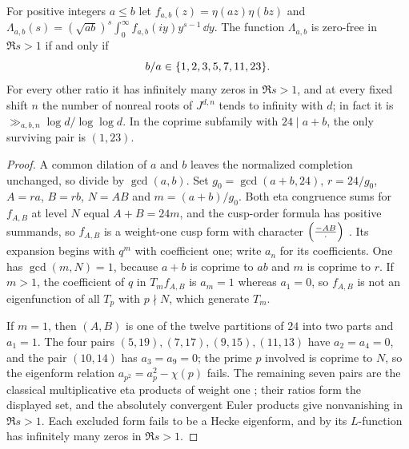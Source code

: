 \begin{theorem}\label{hec:thm:etafamily}
For positive integers $a\le b$ let $f_{a,b}(z)=\eta(az)\eta(bz)$ and
$\Lambda_{a,b}(s)=(\sqrt{ab})^s\int_0^\infty f_{a,b}(iy)y^{s-1}\,\dd y$. The function $\Lambda_{a,b}$ is
zero-free in $\Re s>1$ if and only if
\[
 b/a\in\{1,2,3,5,7,11,23\}.
\]
For every other ratio it has infinitely many zeros in $\Re s>1$, and at every fixed shift $n$ the number
of nonreal roots of $J^{d,n}$ tends to infinity with $d$; in fact it is $\gg_{a,b,n}\log d/\log\log d$.
In the coprime subfamily with $24\mid a+b$, the only surviving pair is $(1,23)$.
\end{theorem}

\begin{proof}
A common dilation of $a$ and $b$ leaves the normalized completion unchanged, so divide by $\gcd(a,b)$. Set
$g_0=\gcd(a+b,24)$, $r=24/g_0$, $A=ra$, $B=rb$, $N=AB$ and $m=(a+b)/g_0$. Both eta congruence sums for
$f_{A,B}$ at level $N$ equal $A+B=24m$, and the cusp-order formula has positive summands, so $f_{A,B}$ is a
weight-one cusp form with character $\Bigl(\frac{-AB}{\cdot}\Bigr)$ \cite[Theorems~1.64--1.65]{Ono2004Web}. Its
expansion begins with $q^m$ with coefficient one; write $a_n$ for its coefficients. One has
$\gcd(m,N)=1$, because $a+b$ is coprime to $ab$ and $m$ is coprime to $r$. If $m>1$, the coefficient of $q$
in $T_mf_{A,B}$ is $a_m=1$ whereas $a_1=0$, so $f_{A,B}$ is not an eigenfunction of all $T_p$ with
$p\nmid N$, which generate $T_m$.

If $m=1$, then $(A,B)$ is one of the twelve partitions of $24$ into two parts and $a_1=1$. The four pairs
$(5,19),(7,17),(9,15),(11,13)$ have $a_2=a_4=0$, and the pair $(10,14)$ has $a_3=a_9=0$; the prime $p$
involved is coprime to $N$, so the eigenform relation $a_{p^2}=a_p^2-\chi(p)$ fails. The remaining seven
pairs are the classical multiplicative eta products of weight one
\cite{DummitKisilevskyMcKay1985Multiplicative,VoskresenskayaEta}; their ratios form the displayed set, and
the absolutely convergent Euler products give nonvanishing in $\Re s>1$. Each excluded form fails to be
a Hecke eigenform, and by \cite[Theorem~1.1 and Remark~(2)]{BookerThorne2014Zeros} its $L$-function has
infinitely many zeros in $\Re s>1$.


\end{proof}
